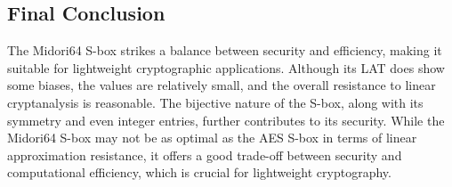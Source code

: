 \documentclass[10pt, a4paper]{article}
\begin{document}
\subsection*{Final Conclusion}

\noindent The Midori64 S-box strikes a balance between security and efficiency,
making it suitable for lightweight cryptographic applications. Although its LAT
does show some biases, the values are relatively small, and the overall
resistance to linear cryptanalysis is reasonable. The bijective nature of the
S-box, along with its symmetry and even integer entries, further contributes to
its security. While the Midori64 S-box may not be as optimal as the AES S-box in
terms of linear approximation resistance, it offers a good trade-off between
security and computational efficiency, which is crucial for lightweight
cryptography.

\end{document}

